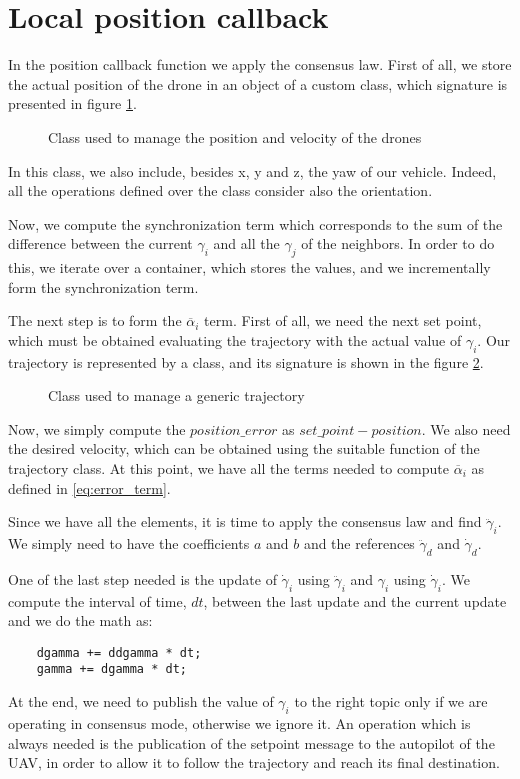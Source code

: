 \section{Local position callback\label{sec:local_position_callback}}

In the position callback function we apply the consensus law. First of all, we
store the actual position of the drone in an object of a custom class,
which signature is presented in figure \ref{fig:drone_pose}.
\begin{figure}[ht]
\centering
  
\caption{Class used to manage the position and velocity of the drones}
\label{fig:drone_pose}
\end{figure}
In this class, we also include, besides x, y and z, the yaw of our vehicle. Indeed,
all the operations defined over the class consider also the orientation.

Now, we compute the synchronization term which corresponds to the sum of the
difference between the current $\gamma_i$ and all the $\gamma_j$ of the neighbors.
In order to do this, we iterate over a container, which stores the values, and
we incrementally form the synchronization term.

The next step is to form the $\overline{\alpha}_i$ term.
First of all, we need the next set point, which must be obtained evaluating
the trajectory with the actual value of $\gamma_i$.
Our trajectory is represented by a class, and its signature is shown in the figure
\ref{fig:trajectory}.
\begin{figure}[ht]
\centering
  
\caption{Class used to manage a generic trajectory}
\label{fig:trajectory}
\end{figure}
Now, we simply compute the $position\_error$ as $set\_point - position$.
We also need the desired velocity, which can be obtained using the suitable function
of the trajectory class.
At this point, we have all the terms needed to compute $\overline{\alpha}_i$
as defined in \ref{eq:error_term}.

Since we have all the elements, it is time to apply the consensus law and find
$\ddot{\gamma}_i$. We simply need to have the coefficients $a$ and $b$
and the references $\ddot{\gamma}_d$ and $\dot{\gamma}_d$.

One of the last step needed is the update of $\dot{\gamma}_i$ using $\ddot{\gamma}_i$
and $\gamma_i$ using $\dot{\gamma}_i$. We compute the interval of time, $dt$, between the
last update and the current update and we do the math as:
\begin{lstlisting}
    dgamma += ddgamma * dt;
    gamma += dgamma * dt;
\end{lstlisting}

At the end, we need to publish the value of $\gamma_i$ to the right topic only
if we are operating in consensus mode, otherwise we ignore it. An operation which is
always needed is the publication of the setpoint message to the autopilot of
the UAV, in order to allow it to follow the trajectory and reach its final destination.
